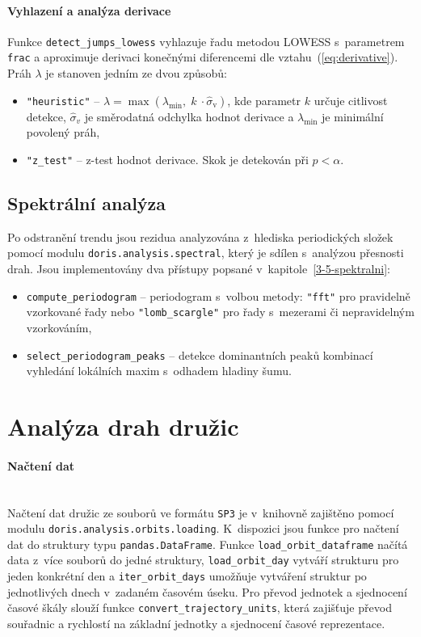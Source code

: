 \paragraph{Vyhlazení a analýza derivace}
Funkce \texttt{detect\_jumps\_lowess} vyhlazuje řadu metodou LOWESS s~parametrem \texttt{frac} a aproximuje derivaci konečnými diferencemi dle vztahu~(\ref{eq:derivative}). Práh \(\lambda\) je stanoven jedním ze dvou způsobů:
\begin{itemize}
    \item \texttt{"heuristic"} --
    $\lambda = \max\!\left(\lambda_{\min},\; k~\cdot \hat{\sigma}_{\mathrm{v}}\right)$,
    kde parametr $k$ určuje citlivost detekce, $\hat{\sigma}_v$ je směrodatná odchylka hodnot derivace a $\lambda_{\min}$ je minimální povolený práh,

    \item \texttt{"z\_test"} --
    z-test hodnot derivace. Skok je detekován při $p < \alpha$.
\end{itemize}

\subsection{Spektrální analýza}
Po odstranění trendu jsou rezidua analyzována z~hlediska periodických
složek pomocí modulu \texttt{doris.analysis.spectral}, který je sdílen
s~analýzou přesnosti drah. Jsou implementovány dva přístupy popsané
v~kapitole~\ref{3-5-spektralni}:
\begin{itemize}
    \item \texttt{compute\_periodogram} -- periodogram s~volbou metody:
    \texttt{"fft"} pro pravidelně vzorkované řady nebo
    \texttt{"lomb\_scargle"} pro řady s~mezerami či nepravidelným vzorkováním,
    \item \texttt{select\_periodogram\_peaks} -- detekce dominantních peaků
    kombinací vyhledání lokálních maxim s~odhadem hladiny šumu.
\end{itemize}

\section{Analýza drah družic}

\paragraph{Načtení dat}\leavevmode\\
Načtení dat družic ze souborů ve formátu \texttt{SP3} je v~knihovně zajištěno pomocí modulu \texttt{doris.analysis.orbits.loading}. K~dispozici jsou funkce pro načtení dat do struktury typu \texttt{pandas.DataFrame}. Funkce \texttt{load\_orbit\_dataframe} načítá data z~více souborů do jedné struktury, \texttt{load\_orbit\_day} vytváří strukturu pro jeden konkrétní den a \texttt{iter\_orbit\_days} umožňuje vytváření struktur po jednotlivých dnech v~zadaném časovém úseku. Pro převod jednotek a sjednocení časové škály slouží funkce \texttt{convert\_trajectory\_units}, která zajišťuje převod souřadnic a rychlostí na základní jednotky a sjednocení časové reprezentace.


